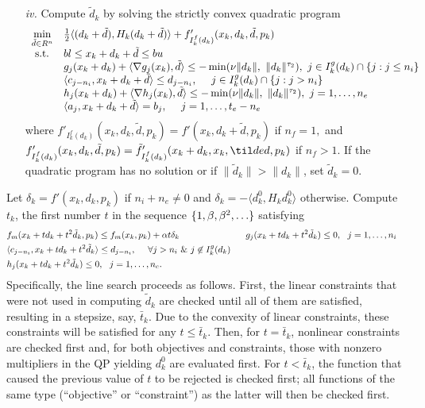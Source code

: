 \begin{itemize}
\item[\it iv.] 
Compute $\tilde d_k$ by solving the strictly convex 
quadratic program
\smallskip
$$\begin{array}{ll} \min\limits_{\tilde d \in R^n} &  \frac{1}{2}
                  \langle (d_k+\tilde d),H_{k}(d_k+\tilde d)\rangle 
                 +f'_{I^f_k(d_k)}(x_k,d_k,\tilde d,p_k) \\
  {\rm ~s.t.} &  bl \leq x_k+d_k+\tilde d \leq bu\\
             & g_j(x_k+d_k) +\langle \nabla g_j(x_k),\tilde d\rangle\leq
                    -\min(\nu\|d_k\|,~\|d_k\|^{\tau _2}),~
                    j\in I^g_k(d_k)\cap\{j:j\leq n_i\}\\
             & \langle c_{j-n_i},x_k+d_k + \tilde d \rangle \leq d_{j-n_i},
                     ~~~~j\in I^g_k(d_k)\cap\{j:j>n_i\}\\
             & h_j(x_k+d_k) +\langle \nabla h_j(x_k),\tilde d\rangle\leq
                    -\min(\nu\|d_k\|,~\|d_k\|^{\tau _2}),~j=1,\ldots,n_e\\
             & \langle a_j,x_k+d_k + \tilde d \rangle=b_j,
                      ~~~~j=1,\ldots,t_e-n_e\end{array}$$
where $f'_{I^f_k(d_k)}(x_k,d_k,\tilde d,p_k)=f'(x_k,d_k+\tilde d,p_k)$ 
if $n_f = 1,$ and
$f'_{I^f_k(d_k)}(x_k,d_k,\tilde d,p_k)=\tilde{f}'_{I^f_k(d_k)}(x_k+d_k,x_k,\til
de d,p_k)$ 
if $n_f > 1$.
If the quadratic program has no solution or 
if $\|\tilde d_k\|>\|d_{k}\|$, set $\tilde d_k=0$.
\end{itemize}

Let $\delta _k=f'(x_k,d_k,p_k)$ if $n_i+n_e\ne 0$ 
and $\delta _k=-\langle d_k^0,H_kd_k^0\rangle$ otherwise.
Compute $t_{k}$, the first number $t$ in 
the sequence $\mbox\{1,\beta,\beta^{2},\ldots\}$ satisfying
\begin{eqnarray*}
\textstyle
& f_m(x_{k}+td_{k}+t^{2}\tilde d_{k},p_k)\leq f_m(x_k,p_k)+\alpha t\delta_k & \
\
& g_j(x_k+td_k+t^2\tilde d_k)\leq0,~~j=1,\ldots,n_i & \\
&\langle c_{j-n_i},x_k+td_k + t^2\tilde{d}_k \rangle \leq d_{j-n_i},
                ~~~~\forall j>n_i~\&~j\not\in I^g_k(d_k)\\
&h_j(x_k+td_k+t^2\tilde d_k)\leq0,~~j=1,\ldots,n_e. &
\end{eqnarray*}
Specifically, the line search proceeds as follows.
First, the linear constraints that were not used
in computing $\tilde{d}_k$ are checked until all of them are
satisfied, resulting in a stepsize, say, $\bar{t}_k$. Due to 
the convexity of linear constraints, these constraints
will be satisfied for any $t\leq \bar{t}_k$. Then, for $t=\bar{t}_k$,
nonlinear constraints are checked first and,
for both objectives and constraints, those with nonzero 
multipliers in the QP yielding $d^0_k$ are evaluated first.
For $t<\bar{t}_k$, the function that caused the previous value of $t$ to
be rejected is checked first; all functions of the same type
(``objective'' or ``constraint'') as the latter
will then be checked first.

